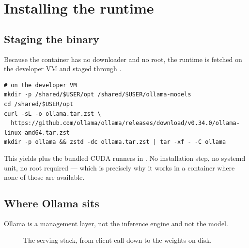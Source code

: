 \section{Installing the runtime}
\label{sec:runtime}

\subsection{Staging the binary}
Because the container has no downloader and no root, the runtime is fetched on
the developer VM and staged through .

\begin{lstlisting}
# on the developer VM
mkdir -p /shared/$USER/opt /shared/$USER/ollama-models
cd /shared/$USER/opt
curl -sL -o ollama.tar.zst \
  https://github.com/ollama/ollama/releases/download/v0.34.0/ollama-linux-amd64.tar.zst
mkdir -p ollama && zstd -dc ollama.tar.zst | tar -xf - -C ollama
\end{lstlisting}

This yields  plus the bundled CUDA runners in .
No installation step, no systemd unit, no root required --- which is precisely
why it works in a container where none of those are available.

\subsection{Where Ollama sits}
Ollama is a management layer, not the inference engine and not the model.

\begin{figure}[!ht]
  \centering
  \caption{The serving stack, from client call down to the weights on disk.}
  \label{fig:gpu-ollama-stack}
\end{figure}

